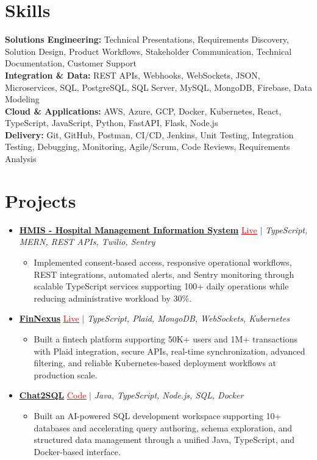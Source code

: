 \documentclass[letterpaper,10pt]{article}
\newcommand{\itemTail}{\vspace{-4pt}}
\newcommand{\sectionGap}{\vspace{-8pt}}
\newcommand{\projGap}{\vspace{3pt}}
\newcommand{\resumeItem}[1]{\item\small{{#1 \itemTail}}}
\newcommand{\resumeProjectHeading}[1]{\item \small #1 \vspace{-2pt}}
\newcommand{\resumeProjectLink}[2]{\href{#1}{\textcolor{red}{\underline{#2}}}}
\newcommand{\resumeSubHeadingListStart}{\begin{itemize}[leftmargin=0.0in, label={}]}
\newcommand{\resumeSubHeadingListEnd}{\end{itemize}}
\newcommand{\resumeProjItemListStart}{\begin{itemize}[leftmargin=0.15in,label=\textbullet,itemsep=3pt,topsep=0pt,parsep=0pt,partopsep=0pt]}
\newcommand{\resumeProjItemListEnd}{\end{itemize}\vspace{-4pt}}
\begin{document}
\section{Skills}
\begin{itemize}[leftmargin=0.15in, label={}]
\small{\item{
\textbf{Solutions Engineering:} Technical Presentations, Requirements Discovery, Solution Design, Product Workflows, Stakeholder Communication, Technical Documentation, Customer Support \\
\textbf{Integration \& Data:} REST APIs, Webhooks, WebSockets, JSON, Microservices, SQL, PostgreSQL, SQL Server, MySQL, MongoDB, Firebase, Data Modeling \\
\textbf{Cloud \& Applications:} AWS, Azure, GCP, Docker, Kubernetes, React, TypeScript, JavaScript, Python, FastAPI, Flask, Node.js \\
\textbf{Delivery:} Git, GitHub, Postman, CI/CD, Jenkins, Unit Testing, Integration Testing, Debugging, Monitoring, Agile/Scrum, Code Reviews, Requirements Analysis
}}
\end{itemize}
\sectionGap
\section{Projects}
\resumeSubHeadingListStart
\vspace{-2pt}
\resumeProjectHeading{\href{https://hims-rouge.vercel.app/}{\textbf{HMIS - Hospital Management Information System}} \resumeProjectLink{https://hims-rouge.vercel.app/}{Live} $|$ \emph{TypeScript, MERN, REST APIs, Twilio, Sentry}}
\resumeProjItemListStart
\resumeItem{Implemented consent-based access, responsive operational workflows, REST integrations, automated alerts, and Sentry monitoring through scalable TypeScript services supporting 100+ daily operations while reducing administrative workload by 30\%.}
\resumeProjItemListEnd
\projGap
\resumeProjectHeading{\href{https://fin-nexus.vercel.app/}{\textbf{FinNexus}} \resumeProjectLink{https://fin-nexus.vercel.app/}{Live} $|$ \emph{TypeScript, Plaid, MongoDB, WebSockets, Kubernetes}}
\resumeProjItemListStart
\resumeItem{Built a fintech platform supporting 50K+ users and 1M+ transactions with Plaid integration, secure APIs, real-time synchronization, advanced filtering, and reliable Kubernetes-based deployment workflows at production scale.}
\resumeProjItemListEnd
\projGap
\resumeProjectHeading{\href{https://github.com/SAHAJ-BHADJA/Chat2SQL}{\textbf{Chat2SQL}} \resumeProjectLink{https://github.com/SAHAJ-BHADJA/Chat2SQL}{Code} $|$ \emph{Java, TypeScript, Node.js, SQL, Docker}}
\resumeProjItemListStart
\resumeItem{Built an AI-powered SQL development workspace supporting 10+ databases and accelerating query authoring, schema exploration, and structured data management through a unified Java, TypeScript, and Docker-based interface.}
\resumeProjItemListEnd
\resumeSubHeadingListEnd
\end{document}
